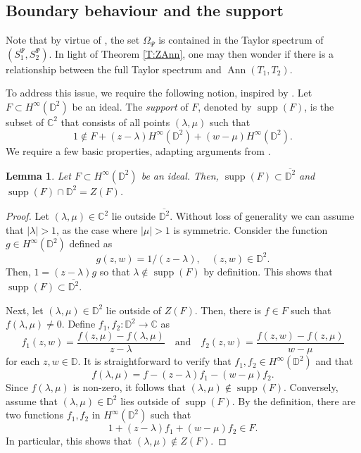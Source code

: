 \documentclass[10pt]{amsart}
\newcommand{\bC}{{\mathbb{C}}}
\newcommand{\bD}{{\mathbb{D}}}
\newcommand{\qand}{\quad\text{and}\quad}
\newcommand{\supp}{\operatorname{supp}}
\newcommand{\Ann}{\operatorname{Ann}}
\newtheorem{lemma}{Lemma}[section]
\theoremstyle{definition}
\begin{document}
\subsection{Boundary behaviour and the support}

Note that by virtue of \cite[Corollary 9.14 and Remark 25.2]{muller2007}, the set $\Omega_\Psi$ is contained in the Taylor spectrum of $(S^\Psi_1,S^\Psi_2)$. In light of Theorem \ref{T:ZAnn}, one may then wonder if there is a relationship between the full Taylor spectrum and $\Ann(T_1,T_2)$. 

To address this issue, we require the following notion, inspired by \cite{CT2023}. Let $F\subset H^\infty(\bD^2)$ be an ideal. The  {\em support} of $F$, denoted by $\supp(F)$, is the subset of $\mathbb{C}^2$ that consists of all points $(\lambda,\mu)$ such that 
\[
1\notin F+(z-\lambda)H^\infty(\bD^2)+(w-\mu)H^\infty(\bD^2).
\]
We require a few basic properties, adapting arguments from  \cite{CT2023}.
	 
	 \begin{lemma}\label{L:supp}
	 	Let $F\subset H^{\infty}(\mathbb{D}^2)$ be an ideal. Then, $\operatorname{supp}(F) \subset \overline{\mathbb{D}^2}$ and 
	 	$\operatorname{supp}(F) \cap \mathbb{D}^2= Z(F)$.
	 \end{lemma}
	 \begin{proof}
Let $(\lambda,\mu)\in \mathbb{C}^2$ lie outside $\overline{\mathbb{D}^2}$. Without loss of generality we can assume that $|\lambda|>1$, as the case where $|\mu|>1$ is symmetric. Consider the function $g\in H^\infty(\bD^2)$ defined as
\[
g(z,w)=1/(z-\lambda), \quad (z,w)\in \bD^2.
\]
Then, $1=(z-\lambda)g$ so that $\lambda\notin \supp(F)$ by definition. This shows that $\operatorname{supp}(F) \subset \overline{\mathbb{D}^2}$.

Next, let $(\lambda,\mu)\in \mathbb{D}^2$ lie outside of $Z(F)$. Then, there is $f\in F$ such that $f(\lambda,\mu)\neq 0$. Define $f_1,f_2:\bD^2\to \bC$ as
\[
f_1(z,w)=\frac{f(z,\mu)-f(\lambda,\mu)}{z-\lambda} \qand f_2(z,w)=\frac{f(z,w)-f(z,\mu)}{w-\mu}
\]
for each $z,w\in \bD$. It is straightforward to verify that $f_1,f_2\in H^\infty(\bD^2)$ and that
	 	$$	f(\lambda,\mu)= f-(z-\lambda)f_1-(w-\mu)f_2.$$
	 	Since $f(\lambda,\mu)$ is non-zero, it follows that $(\lambda,\mu)\notin\supp(F)$. Conversely, assume that $(\lambda,\mu)\in \bD^2$  lies outside of  $\supp(F)$. By the definition,  there are two functions $f_1, f_2$ in $H^{\infty}(\mathbb{D}^2)$ such that 
	 	$$	1+ (z-\lambda )f_1+ (w-\mu) f_2\in F	.$$
	 	In particular, this shows that $(\lambda,\mu)\notin Z(F)$.
	 \end{proof}
	 
\end{document}
